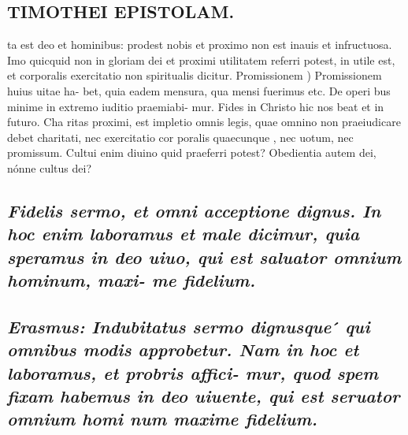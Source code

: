 \documentclass{article}
\begin{document}
\begin{pages}
\section*{TIMOTHEI EPISTOLAM. }
\marginpar{[ p.105 ]}\pstart ta est deo et hominibus: prodest nobis et proximo non est inauis et infructuosa. Imo quicquid non in gloriam dei et proximi utilitatem referri potest, in utile est, et corporalis exercitatio non spiritualis dicitur.  \pend\pstart Promissionem ) Promissionem huius uitae ha- bet, quia eadem mensura, qua mensi fuerimus etc. De operi bus minime in extremo iuditio praemiabi- mur. Fides in Christo hic nos beat et in futuro. Cha ritas proximi, est impletio omnis legis, quae omnino non praeiudicare debet charitati, nec exercitatio cor poralis quaecunque , nec uotum, nec promissum. Cultui enim diuino quid praeferri potest? Obedientia autem dei, nónne cultus dei?  \pend
{}
{}
\subsection*{\textit{Fidelis sermo, et omni acceptione dignus. In hoc enim laboramus et male dicimur, quia speramus in deo uiuo, qui est saluator omnium hominum, maxi- me fidelium. }}
{}
\subsection*{\textit{Erasmus: Indubitatus sermo dignusque ́ qui omnibus modis approbetur. Nam in hoc et laboramus, et probris affici- mur, quod spem fixam habemus in deo uiuente, qui est seruator omnium homi num maxime fidelium. }}

\end{pages}
\end{document}
